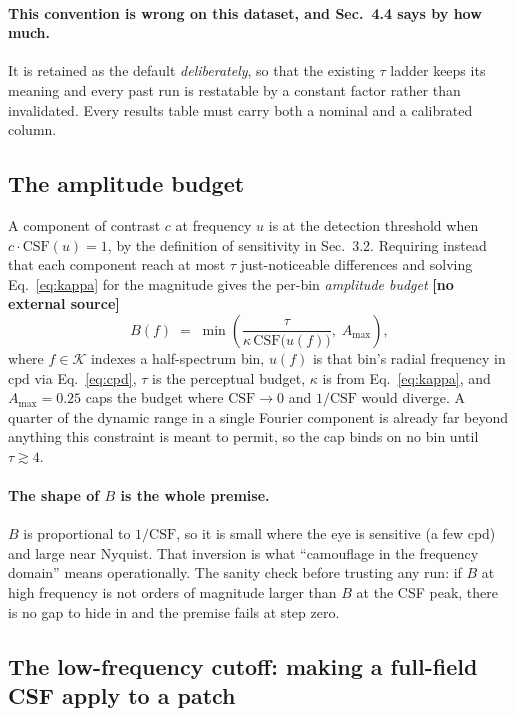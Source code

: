 \documentclass[11pt,a4paper]{article}
\newcommand{\novel}{\textbf{[no external source]}}
\newcommand{\cpd}{\mathrm{cpd}}
\begin{document}
\paragraph{This convention is wrong on this dataset, and Sec.~4.4 says by how
much.} It is retained as the default \emph{deliberately}, so that the
existing $\tau$ ladder keeps its meaning and every past run is restatable by
a constant factor rather than invalidated. Every results table must carry
both a nominal and a calibrated column.

\subsection{The amplitude budget}

A component of contrast $c$ at frequency $u$ is at the detection threshold
when $c\cdot\mathrm{CSF}(u)=1$, by the definition of sensitivity in Sec.~3.2.
Requiring instead that each component reach at most $\tau$ just-noticeable
differences and solving Eq.~\eqref{eq:kappa} for the magnitude gives the
per-bin \emph{amplitude budget} \novel{}
\begin{equation}
  B(f) \;=\; \min\!\left(
     \frac{\tau}{\kappa\,\mathrm{CSF}\big(u(f)\big)},\;
     A_{\max}\right),
  \label{eq:budget}
\end{equation}
where $f\in\mathcal{K}$ indexes a half-spectrum bin, $u(f)$ is that bin's
radial frequency in $\cpd$ via Eq.~\eqref{eq:cpd}, $\tau$ is the perceptual
budget, $\kappa$ is from Eq.~\eqref{eq:kappa}, and $A_{\max}=0.25$ caps the
budget where $\mathrm{CSF}\to0$ and $1/\mathrm{CSF}$ would diverge. A quarter
of the dynamic range in a single Fourier component is already far beyond
anything this constraint is meant to permit, so the cap binds on no bin
until $\tau\gtrsim4$.

\paragraph{The shape of $B$ is the whole premise.}
$B$ is proportional to $1/\mathrm{CSF}$, so it is small where the eye is
sensitive (a few $\cpd$) and large near Nyquist. That inversion is what
``camouflage in the frequency domain'' means operationally. The sanity check
before trusting any run: if $B$ at high frequency is not orders of magnitude
larger than $B$ at the CSF peak, there is no gap to hide in and the premise
fails at step zero.

\subsection{The low-frequency cutoff: making a full-field CSF apply to a
patch}
\label{sec:mincycles}
\end{document}
